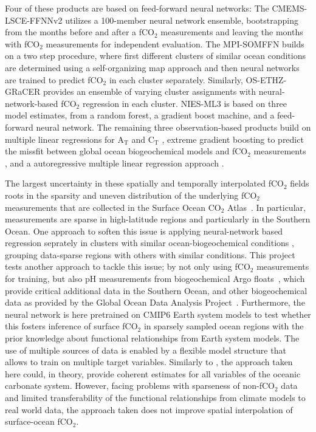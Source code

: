 \documentclass{article}
\begin{document}
	Four of these products are based on feed-forward neural networks: The CMEMS-LSCE-FFNNv2 \citep{chau2022} utilizes a 100-member neural network ensemble,  bootstrapping from the months before and after a fCO$_2$ measurements and leaving the months with fCO$_2$ measurements for independent evaluation. The MPI-SOMFFN \citep{landschuetzer2016} builds on a two step procedure, where first different clusters of similar ocean conditions are determined using a self-organizing map approach and then neural networks are trained to predict fCO$_2$ in each cluster separately. Similarly, OS-ETHZ-GRaCER \citep{gregor2021} provides an ensemble of varying cluster assignments with neural-network-based fCO$_2$ regression in each cluster. NIES-ML3 \citep{zeng2022} is based on three model estimates, from a random forest, a gradient boost machine, and a feed-forward neural network. The remaining three observation-based products build on multiple linear regressions for A$_\text{T}$ and C$_\text{T}$ \citep[fundamental variables to calculate fCO$_2$ and other carbonate system variables; JMA-MLR;][]{iida2021}, extreme gradient boosting to predict the missfit between global ocean biogeochemical models and fCO$_2$ measurements \citep[LDEO-HPD;][]{gloege2022}, and a autoregressive multiple linear regression approach \citep[Jena-MLS;][]{roedenbeck2022}.
	
	The largest uncertainty in these spatially and temporally interpolated fCO$_2$ fields roots in the sparsity and uneven distribution of the underlying fCO$_2$ measurements that are collected in the Surface Ocean CO$_2$ Atlas~\citep{bakker2016}. In particular, measurements are sparse in high-latitude regions and particularly in the Southern Ocean. One approach to soften this issue is applying neural-network based regression seprately in clusters with similar ocean-biogeochemical conditions \citep{landschuetzer2016,gregor2021}, grouping data-sparse regions with others with similar conditions. This project tests another approach to tackle this issue; by not only using fCO$_2$ measurements for training, but also pH measurements from biogeochemical Argo floats~\citep{johnson2017}, which provide critical additional data in the Southern Ocean, and other biogeochemical data as provided by the Global Ocean Data Analysis Project~\citep[GLODAPv2;][]{olsen2016,lauvset2024}. Furthermore, the neural network is here pretrained on CMIP6 Earth system models to test whether this fosters inference of surface fCO$_2$ in sparsely sampled ocean regions with the prior knowledge about functional relationships from Earth system models. The use of multiple sources of data is enabled by a flexible model structure that allows to train on multiple target variables. Similarly to \cite{iida2021}, the approach taken here could, in theory, provide coherent estimates for all variables of the oceanic carbonate system. However, facing problems with sparseness of non-fCO$_2$ data and limited transferability of the functional relationships from climate models to real world data, the approach taken does not improve spatial interpolation of surface-ocean fCO$_2$.
	
\end{document}
